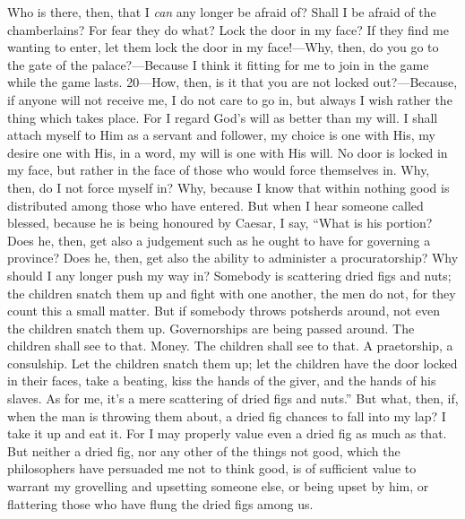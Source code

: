 Who is there, then, that I \emph{can} any longer be afraid of? Shall I be afraid of the chamberlains? For fear they do what? Lock the door in my face? If they find me wanting to enter, let them lock the door in my face!—Why, then, do you go to the gate of the palace?—Because I think it fitting for me to join in the game while the game lasts. 20—How, then, is it that you are not locked out?—Because, if anyone will not receive me, I do not care to go in, but always I wish rather the thing which takes place. For I regard God's will as better than my will. I shall attach myself to Him as a servant and follower, my choice is one with His, my desire one with His, in a word, my will is one with His will. No door is locked in my face, but rather in the face of those who would force themselves in. Why, then, do I not force myself in? Why, because I know that within nothing good is distributed among those who have entered. But when I hear someone called blessed, because he is being honoured by Caesar, I say, ``What is his portion? Does he, then, get also a judgement such as he ought to have for governing a province? Does he, then, get also the ability to administer a procuratorship? Why should I any longer push my way in? Somebody is scattering dried figs and nuts; the children snatch them up and fight with one another, the men do not, for they count this a small matter. But if somebody throws potsherds around, not even the children snatch them up. Governorships are being passed around. The children shall see to that. Money. The children shall see to that. A praetorship, a consulship. Let the children snatch them up; let the children have the door locked in their faces, take a beating, kiss the hands of the giver, and the hands of his slaves. As for me, it's a mere scattering of dried figs and nuts.'' But what, then, if, when the man is throwing them about, a dried fig chances to fall into my lap? I take it up and eat it. For I may properly value even a dried fig as much as that. But neither a dried fig, nor any other of the things not good, which the philosophers have persuaded me not to think good, is of sufficient value to warrant my grovelling and upsetting someone else, or being upset by him, or flattering those who have flung the dried figs among us.

